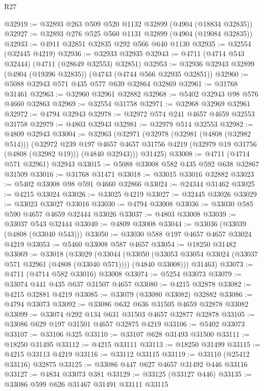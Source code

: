 \begin{lexlean}{R27}
\begin{coremodule}
@32919 := @32893 @263 @509 @520 @1132 @32899 (@4904 (@18834 @32835))
@32927 := @32893 @276 @525 @560 @1131 @32899 (@4904 (@19084 @32835))
@32933 := @4911 @32851 @32835 @292 @566 @640 @1130
@32935 := @32554 (@32445 @4219)
@32936 := @32933 @32935
@32943 := @4711 (@4714 @543 @32444) (@4711 (@28649 @32553) @32851)
@32953 := @32936 @32943 @32899 (@4904 (@19396 @32835)) (@4743 (@4744 @566 @32935 @32851))
@32960 := @5088 @32943 @571 @435 @577 @639 @32864 @32869
@32961 := @31768 @31461
@32963 := @32960 @32961 @32882
@32968 := @5402 @32943 @98 @576 @4660 @32863
@32969 := @32554 @31758
@32971 := @32968 @32969 @32961
@32972 := @4794 @32943
@32978 := @32972 @574 @241 @4657 @4659 @32553 @31758
@32979 := @4803 @32943
@32981 := @32979 @514 @32553
@32982 := @4809 @32943
@33004 := @32963
    (@32971
      (@32978
        (@32981 (@4808 (@32982 @514)))
        (@32972
          @239
          @197
          @4657
          @4657
          @31756
          @4219
          (@32979 @19 @31756 (@4808 (@32982 @19)))
          (@4840 @32943)))
      @31425)
@33008 := @4711 (@4714 @571 @32961) @32943
@33015 := @5088 @33008 @582 @435 @592 @638 @32867 @31509
@33016 := @31768 @31471
@33018 := @33015 @33016 @32882
@33023 := @5402 @33008 @98 @591 @4660 @32866
@33024 := @24344 @31462
@33025 := @4215 @33024
@33026 := @33025 @4219
@33027 := @32445 @33026
@33029 := @33023 @33027 @33016
@33030 := @4794 @33008
@33036 := @33030 @585 @590 @4657 @4659 @32444 @33026
@33037 := @4803 @33008
@33039 := @33037 @543 @32444
@33040 := @4809 @33008
@33044 := @33036 (@33039 (@4808 (@33040 @543)))
@33050 := @33030 @588 @197 @4657 @4657 @33024 @4219
@33053 := @5460 @33008 @587 @4657
@33054 := @18250 @31482
@33069 := @33018
    (@33029
      (@33044
        (@33050 (@33053 @33054 @33024 (@33037 @571 @32961 (@4808 (@33040 @571)))) (@4840 @33008)))
      @31463)
@33073 := @4711 (@4714 @582 @33016) @33008
@33074 := @5254 @33073
@33079 := @33074 @441 @435 @637 @31507 @4657
@33080 := @4215 @32878
@33082 := @4215 @32881 @4219
@33085 := @33079 (@33080 @33082) @32882
@33086 := @4794 @33073
@33092 := @33086 @632 @636 @31505 @4659 @32878 @33082
@33099 := @33074 @292 @134 @631 @31503 @4657 @32877 @32878
@33105 := @33086 @629 @197 @31501 @4657 @32875 @4219
@33106 := @5402 @33073
@33107 := @33106 @325
@33110 := @33107 @628 @31493 @31500
@33111 := @18250 @31495
@33112 := @4215 @33111
@33113 := @18250 @31499
@33115 := @4215 @33113 @4219
@33116 := @33112 @33115
@33119 := @33110 (@25412 @33116) @32875
@33125 := @33086 @447 @627 @4657 @31492 @446 @33116
@33127 := @4834 @33073 @381
@33129 := @33125 (@33127 @446)
@33135 := @33086 @599 @626 @31467 @31491 @33111 @33115

\end{coremodule}
\end{lexlean}
